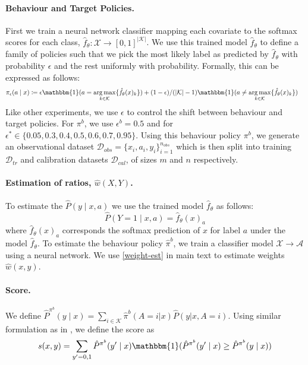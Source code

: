 \paragraph{Behaviour and Target Policies.}
First we train a neural network classifier mapping each covariate to the softmax scores for each class, $\hat{f}_\theta: \mathcal{X} \rightarrow [0,1]^{|\mathcal{K}|}$. We use this trained model $\hat{f}_\theta$ to define a family of policies such that we pick the most likely label as predicted by $\hat{f}_\theta$ with probability $\epsilon$ and the rest uniformly with probability. Formally, this can be expressed as follows:
\begin{align}
    &\pi_\epsilon (a\mid x) \coloneqq \epsilon \mathbbm{1}(a = \argmax_{k \in \mathcal{K}}\{ \hat{f}_\theta(x)_{k} \}) + (1-\epsilon)/(|\mathcal{K}|-1)\mathbbm{1}(a \neq \argmax_{k \in \mathcal{K}}\{ \hat{f}_\theta(x)_{k} \}) \nonumber
\end{align}
Like other experiments, we use $\epsilon$ to control the shift between behaviour and target policies. For $\pi^b$, we use $\epsilon^b = 0.5$ and for $\epsilon^* \in \{0.05, 0.3, 0.4, 0.5, 0.6, 0.7, 0.95\}$. Using this behaviour policy $\pi^b$, we generate an observational dataset $\mathcal{D}_{obs} = \{x_i, a_i, y_i\}_{i=1}^{n_{obs}}$ which is then split into training $\mathcal{D}_{tr}$ and calibration datasets $\mathcal{D}_{cal}$, of sizes $m$ and $n$ respectively.

\paragraph{Estimation of ratios, $\hat{w}(X, Y)$.}
To estimate the $\hat{P}(y \mid x, a)$ we use the trained model $\hat{f}_\theta$ as follows:
\[
\hat{P}(Y = 1 \mid x, a) = \hat{f}_\theta(x)_a
\]
where $\hat{f}_\theta(x)_a$ corresponds the softmax prediction of $x$ for label $a$ under the model $\hat{f}_\theta$. To estimate the behaviour policy $\hat{\pi}^b$, we train a classifier model $\mathcal{X} \rightarrow \mathcal{A}$ using a neural network. We use \eqref{weight-est} in main text to estimate weights $\hat{w}(x, y)$.


\paragraph{Score.} We define $\hat{P}^{\pi^b}(y \mid x) = \sum_{i \in \mathcal{K}} \hat{\pi}^b(A = i|x) \hat{P}(y|x, A = i)$. Using similar formulation as in \cite{conf-bates}, we define the score as 
\[
s(x, y) = \sum_{y' = 0, 1} \hat{P}^{\pi^b}(y' \mid x) \mathbbm{1}(\hat{P}^{\pi^b}(y' \mid x) \geq \hat{P}^{\pi^b}(y \mid x))
\]


